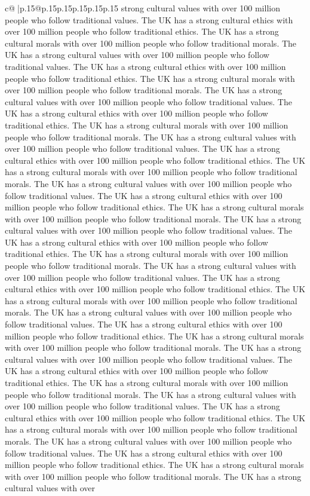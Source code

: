 \documentclass{article}
\begin{document}
{\begin{supertabular}{c@{$\;$}|p{.15\linewidth}@{}p{.15\linewidth}p{.15\linewidth}p{.15\linewidth}p{.15\linewidth}p{.15\linewidth}}
{{{strong cultural values with over 100 million people who follow traditional values. The UK has a strong cultural ethics with over 100 million people who follow traditional ethics. The UK has a strong cultural morals with over 100 million people who follow traditional morals. The UK has a strong cultural values with over 100 million people who follow traditional values. The UK has a strong cultural ethics with over 100 million people who follow traditional ethics. The UK has a strong cultural morals with over 100 million people who follow traditional morals. The UK has a strong cultural values with over 100 million people who follow traditional values. The UK has a strong cultural ethics with over 100 million people who follow traditional ethics. The UK has a strong cultural morals with over 100 million people who follow traditional morals. The UK has a strong cultural values with over 100 million people who follow traditional values. The UK has a strong cultural ethics with over 100 million people who follow traditional ethics. The UK has a strong cultural morals with over 100 million people who follow traditional morals. The UK has a strong cultural values with over 100 million people who follow traditional values. The UK has a strong cultural ethics with over 100 million people who follow traditional ethics. The UK has a strong cultural morals with over 100 million people who follow traditional morals. The UK has a strong cultural values with over 100 million people who follow traditional values. The UK has a strong cultural ethics with over 100 million people who follow traditional ethics. The UK has a strong cultural morals with over 100 million people who follow traditional morals. The UK has a strong cultural values with over 100 million people who follow traditional values. The UK has a strong cultural ethics with over 100 million people who follow traditional ethics. The UK has a strong cultural morals with over 100 million people who follow traditional morals. The UK has a strong cultural values with over 100 million people who follow traditional values. The UK has a strong cultural ethics with over 100 million people who follow traditional ethics. The UK has a strong cultural morals with over 100 million people who follow traditional morals. The UK has a strong cultural values with over 100 million people who follow traditional values. The UK has a strong cultural ethics with over 100 million people who follow traditional ethics. The UK has a strong cultural morals with over 100 million people who follow traditional morals. The UK has a strong cultural values with over 100 million people who follow traditional values. The UK has a strong cultural ethics with over 100 million people who follow traditional ethics. The UK has a strong cultural morals with over 100 million people who follow traditional morals. The UK has a strong cultural values with over 100 million people who follow traditional values. The UK has a strong cultural ethics with over 100 million people who follow traditional ethics. The UK has a strong cultural morals with over 100 million people who follow traditional morals. The UK has a strong cultural values with over }}}
\end{supertabular}}
\end{document}
